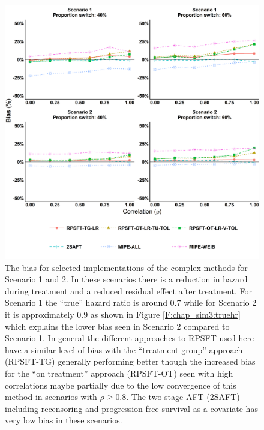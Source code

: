 \begin{figure}[ht]
\centering
\includegraphics[width=13cm]{images/chap_sim3/comp_bias12.png}
\caption{\label{F:chap_sim3:comp_bias12} The bias for selected implementations of the complex methods for Scenario 1 and 2. In these scenarios there is a reduction in hazard during treatment and a reduced residual effect after treatment. For Scenario 1 the ``true''  hazard ratio is around 0.7 while for Scenario 2 it is approximately 0.9 as shown in Figure \ref{F:chap_sim3:truehr} which explains the lower bias seen in Scenario 2 compared to Scenario 1. In general the different approaches to RPSFT used here have a similar level of bias with the ``treatment group'' approach (RPSFT-TG) generally performing better though the increased bias for the ``on treatment'' approach (RPSFT-OT) seen with high correlations maybe partially due to the low convergence of this method in scenarios with $\rho \geq 0.8$. The two-stage AFT (2SAFT) including recensoring and progression free survival as a covariate has very low bias in these scenarios.}
\end{figure}

